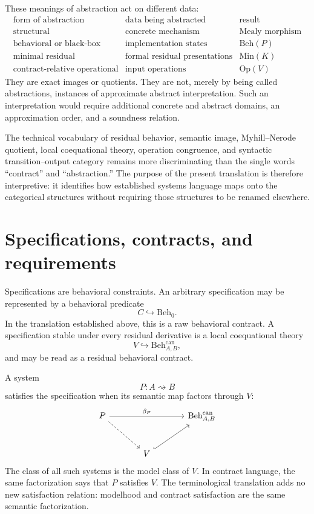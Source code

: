 These meanings of abstraction act on different data:
\[
\begin{array}{c|c|c}
\text{form of abstraction}
&
\text{data being abstracted}
&
\text{result}
\\
\hline
\text{structural}
&
\text{concrete mechanism}
&
\text{Mealy morphism}
\\
\text{behavioral or black-box}
&
\text{implementation states}
&
\mathrm{Beh}(P)
\\
\text{minimal residual}
&
\text{formal residual presentations}
&
\mathrm{Min}(K)
\\
\text{contract-relative operational}
&
\text{input operations}
&
\mathrm{Op}(V)
\end{array}
\]
They are exact images or quotients.  They are not, merely by being called
abstractions, instances of approximate abstract interpretation.  Such an
interpretation would require additional concrete and abstract domains, an
approximation order, and a soundness relation.

The technical vocabulary of residual behavior, semantic image,
Myhill--Nerode quotient, local coequational theory, operation congruence, and
syntactic transition--output category remains more discriminating than the
single words ``contract'' and ``abstraction.''  The purpose of the present
translation is therefore interpretive: it identifies how established systems
language maps onto the categorical structures without requiring those
structures to be renamed elsewhere.

\section{Specifications, contracts, and requirements}
\label{sec:specifications-and-requirements}

Specifications are behavioral constraints.  An arbitrary specification may be
represented by a behavioral predicate
\[
  C\hookrightarrow \mathrm{Beh}_0.
\]
In the translation established above, this is a raw behavioral contract.  A
specification stable under every residual derivative is a local coequational
theory
\[
  V\hookrightarrow \mathrm{Beh}^{\mathrm{can}}_{A,B},
\]
and may be read as a residual behavioral contract.

A system
\[
  P:A\rightsquigarrow B
\]
satisfies the specification when its semantic map factors through \(V\):
\[
\begin{tikzcd}[column sep=large,row sep=large]
  P
    \ar[rr,"\beta_P"]
    \ar[dr,dashed]
  &&
  \mathrm{Beh}^{\mathrm{can}}_{A,B}
  \\
  &
  V
    \ar[ur,hook]
  &
\end{tikzcd}
\]
The class of all such systems is the model class of \(V\).  In contract
language, the same factorization says that \(P\) satisfies \(V\).  The
terminological translation adds no new satisfaction relation: modelhood and
contract satisfaction are the same semantic factorization.

